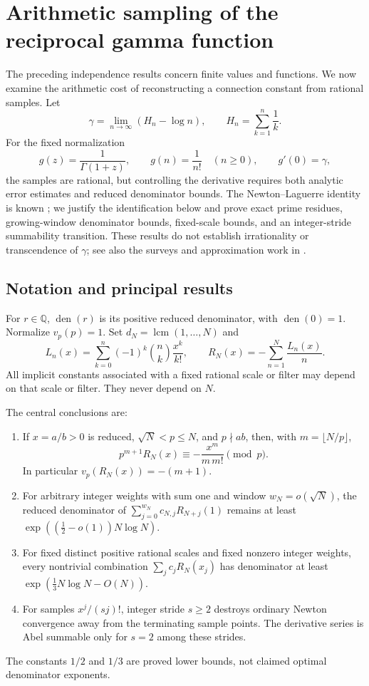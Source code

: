 \documentclass[11pt,a4paper]{article}
\newcommand{\Q}{\mathbb Q}
\DeclareMathOperator{\den}{den}
\DeclareMathOperator{\lcm}{lcm}
\theoremstyle{definition}
\theoremstyle{remark}
\numberwithin{equation}{section}
\begin{document}
\section{Arithmetic sampling of the reciprocal gamma function}
\label{sample:sec:intro}
The preceding independence results concern finite values and functions.
We now examine the arithmetic cost of reconstructing a connection
constant from rational samples. Let
\[
 \gamma=\lim_{n\to\infty}(H_n-\log n),\qquad
 H_n=\sum_{k=1}^{n}\frac1k.
\]
For the fixed normalization
\begin{equation}\label{sample:eq:integerdata}
 g(z)=\frac1{\Gamma(1+z)},\qquad
 g(n)=\frac1{n!}\quad(n\ge0),\qquad g'(0)=\gamma,
\end{equation}
the samples are rational, but controlling the derivative requires
both analytic error estimates and reduced denominator bounds.
The Newton--Laguerre identity is known
\cite[Theorem 2.1 and Corollary 2.6]{Ulgenes}; we justify the
identification below and prove exact prime residues, growing-window
denominator bounds, fixed-scale bounds, and an integer-stride
summability transition. These results do not establish irrationality
or transcendence of $\gamma$; see also the surveys and approximation
work in \cite{Lagarias,VanAsscheWolfs}.

\subsection*{Notation and principal results}
For $r\in\Q$, $\den(r)$ is its positive reduced denominator, with
$\den(0)=1$. Normalize $v_p(p)=1$. Set $d_N=\lcm(1,\ldots,N)$ and
\begin{equation}\label{sample:eq:RNdef}
L_n(x)=\sum_{k=0}^n(-1)^k\binom nk\frac{x^k}{k!},\qquad
R_N(x)=-\sum_{n=1}^N\frac{L_n(x)}n.
\end{equation}
All implicit constants associated with a fixed rational scale or filter
may depend on that scale or filter. They never depend on $N$.

The central conclusions are:
\begin{enumerate}
\item If $x=a/b>0$ is reduced, $\sqrt N<p\le N$, and $p\nmid ab$, then,
with $m=\lfloor N/p\rfloor$,
\[
p^{m+1}R_N(x)\equiv-\frac{x^m}{m\,m!}\pmod p.
\]
In particular $v_p(R_N(x))=-(m+1)$.
\item For arbitrary integer weights with sum one and window
$w_N=o(\sqrt N)$, the reduced denominator of
$\sum_{j=0}^{w_N}c_{N,j}R_{N+j}(1)$ remains at least
$\exp((\frac12-o(1))N\log N)$.
\item For fixed distinct positive rational scales and fixed nonzero
integer weights, every nontrivial combination
$\sum_j c_jR_N(x_j)$ has denominator at least
$\exp(\frac13N\log N-O(N))$.
\item For samples $x^j/(sj)!$, integer stride $s\ge2$ destroys ordinary
Newton convergence away from the terminating sample points. The
derivative series is Abel summable only for $s=2$ among these strides.
\end{enumerate}
The constants $1/2$ and $1/3$ are proved lower bounds, not claimed optimal
denominator exponents.
\end{document}
